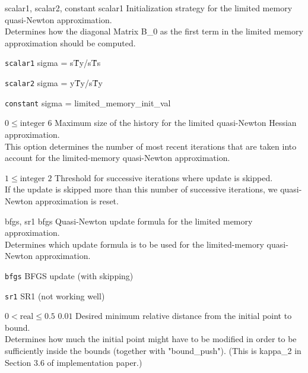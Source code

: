 %
{scalar1, scalar2, constant}%
{scalar1}%
{Initialization strategy for the limited memory quasi-Newton approximation.\\
Determines how the diagonal Matrix B\_0 as the first term in the limited memory approximation should be computed.}%
{\begin{list}{}{
\setlength{\parsep}{0em}
\setlength{\leftmargin}{5ex}
\setlength{\labelwidth}{2ex}
\setlength{\itemindent}{0ex}
\setlength{\topsep}{0pt}}
\item[\texttt{scalar1}] sigma = s\^Ty/s\^Ts
\item[\texttt{scalar2}] sigma = y\^Ty/s\^Ty
\item[\texttt{constant}] sigma = limited\_memory\_init\_val
\end{list}
}

%
{$0\leq\textrm{integer}$}%
{$6$}%
{Maximum size of the history for the limited quasi-Newton Hessian approximation.\\
This option determines the number of most recent iterations that are taken into account for the limited-memory quasi-Newton approximation.}%
{}

%
{$1\leq\textrm{integer}$}%
{$2$}%
{Threshold for successive iterations where update is skipped.\\
If the update is skipped more than this number of successive iterations, we quasi-Newton approximation is reset.}%
{}

%
{bfgs, sr1}%
{bfgs}%
{Quasi-Newton update formula for the limited memory approximation.\\
Determines which update formula is to be used for the limited-memory quasi-Newton approximation.}%
{\begin{list}{}{
\setlength{\parsep}{0em}
\setlength{\leftmargin}{5ex}
\setlength{\labelwidth}{2ex}
\setlength{\itemindent}{0ex}
\setlength{\topsep}{0pt}}
\item[\texttt{bfgs}] BFGS update (with skipping)
\item[\texttt{sr1}] SR1 (not working well)
\end{list}
}

%
{$0<\textrm{real}\leq0.5$}%
{$0.01$}%
{Desired minimum relative distance from the initial point to bound.\\
Determines how much the initial point might have to be modified in order to be sufficiently inside the bounds (together with "bound\_push").  (This is kappa\_2 in Section 3.6 of implementation paper.)}%
{}

